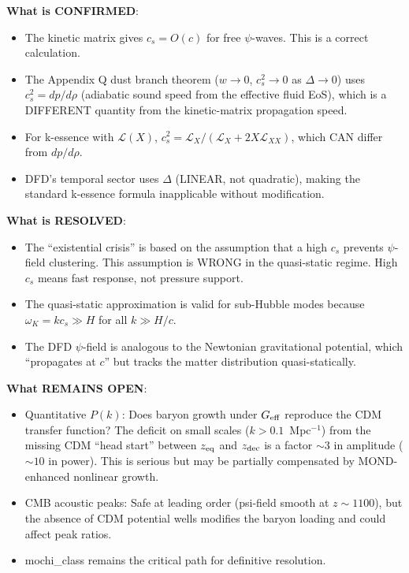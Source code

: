 \documentclass[11pt]{article}
\begin{document}
\begin{tcolorbox}[colback=blue!5!white, colframe=blue!70!black,
  title=\textbf{W4i18 TOP 5 FINDINGS --- DUST BRANCH EXISTENTIAL RESOLUTION}]
\begin{enumerate}
  \textbf{What is CONFIRMED}:
  \begin{itemize}[nosep]
  \item The kinetic matrix gives $c_s = O(c)$ for free $\psi$-waves.
    This is a correct calculation.
  \item The Appendix Q dust branch theorem ($w \to 0$, $c_s^2 \to 0$
    as $\Delta \to 0$) uses $c_s^2 = dp/d\rho$ (adiabatic sound
    speed from the effective fluid EoS), which is a DIFFERENT
    quantity from the kinetic-matrix propagation speed.
  \item For k-essence with $\mathcal{L}(X)$, $c_s^2 =
    \mathcal{L}_X/(\mathcal{L}_X + 2X\mathcal{L}_{XX})$, which
    CAN differ from $dp/d\rho$.
  \item DFD's temporal sector uses $\Delta$ (LINEAR, not quadratic),
    making the standard k-essence formula inapplicable without
    modification.
  \end{itemize}

  \textbf{What is RESOLVED}:
  \begin{itemize}[nosep]
  \item The ``existential crisis'' is based on the assumption that
    a high $c_s$ prevents $\psi$-field clustering. This assumption
    is WRONG in the quasi-static regime. High $c_s$ means fast
    response, not pressure support.
  \item The quasi-static approximation is valid for sub-Hubble modes
    because $\omega_K = kc_s \gg H$ for all $k \gg H/c$.
  \item The DFD $\psi$-field is analogous to the Newtonian
    gravitational potential, which ``propagates at $c$'' but tracks
    the matter distribution quasi-statically.
  \end{itemize}

  \textbf{What REMAINS OPEN}:
  \begin{itemize}[nosep]
  \item Quantitative $P(k)$: Does baryon growth under $G_{\rm eff}$
    reproduce the CDM transfer function? The deficit on small scales
    ($k > 0.1$~Mpc$^{-1}$) from the missing CDM ``head start''
    between $z_{\rm eq}$ and $z_{\rm dec}$ is a factor $\sim 3$
    in amplitude ($\sim 10$ in power). This is serious but may
    be partially compensated by MOND-enhanced nonlinear growth.
  \item CMB acoustic peaks: Safe at leading order (psi-field smooth
    at $z \sim 1100$), but the absence of CDM potential wells
    modifies the baryon loading and could affect peak ratios.
  \item mochi\_class remains the critical path for definitive
    resolution.
  \end{itemize}

\end{enumerate}
\end{tcolorbox}
\end{document}
